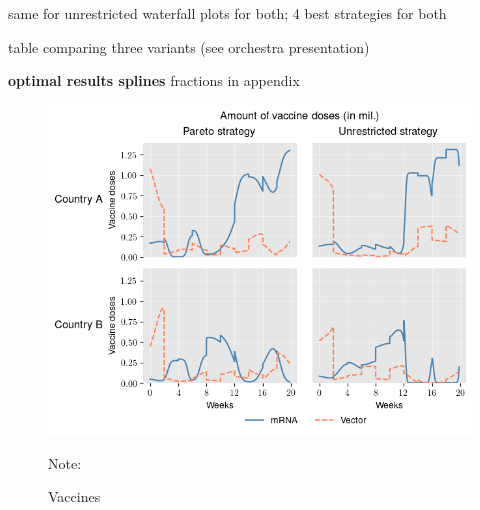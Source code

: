 
same for unrestricted
waterfall plots for both;
4 best strategies for both


table comparing three variants (see orchestra presentation)




\textbf{optimal results splines}
fractions in appendix
\begin{figure}[h!]
\centering
\includegraphics[scale=0.8]{images/splines_vaccine_total_quantity.png}\\
\begin{flushleft}
\scriptsize{Note:}
\end{flushleft}
\caption{Vaccines}
\label{fig:results_splines_allocation}
\end{figure}

